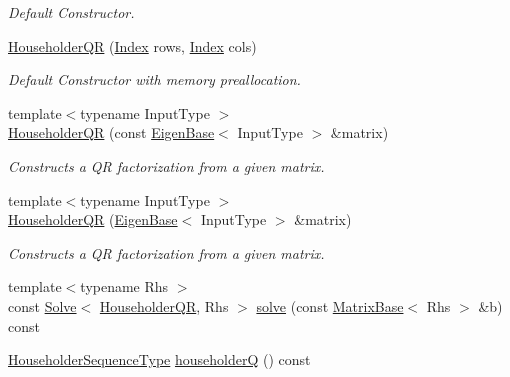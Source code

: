 \begin{DoxyCompactItemize}
\begin{DoxyCompactList}\small\item\em Default Constructor. \end{DoxyCompactList}\item 
\hyperlink{group___q_r___module_a1087457610c53e1574de521a51de0cd3}{Householder\+QR} (\hyperlink{namespace_eigen_a62e77e0933482dafde8fe197d9a2cfde}{Index} rows, \hyperlink{namespace_eigen_a62e77e0933482dafde8fe197d9a2cfde}{Index} cols)
\begin{DoxyCompactList}\small\item\em Default Constructor with memory preallocation. \end{DoxyCompactList}\item 
{\footnotesize template$<$typename Input\+Type $>$ }\\\hyperlink{group___q_r___module_afa7cfb4faa89195c4dc8d196924c8230}{Householder\+QR} (const \hyperlink{group___core___module_struct_eigen_1_1_eigen_base}{Eigen\+Base}$<$ Input\+Type $>$ \&matrix)
\begin{DoxyCompactList}\small\item\em Constructs a QR factorization from a given matrix. \end{DoxyCompactList}\item 
{\footnotesize template$<$typename Input\+Type $>$ }\\\hyperlink{group___q_r___module_a95a53f8479ee147d7b0ccab71c13e45d}{Householder\+QR} (\hyperlink{group___core___module_struct_eigen_1_1_eigen_base}{Eigen\+Base}$<$ Input\+Type $>$ \&matrix)
\begin{DoxyCompactList}\small\item\em Constructs a QR factorization from a given matrix. \end{DoxyCompactList}\item 
{\footnotesize template$<$typename Rhs $>$ }\\const \hyperlink{group___core___module_class_eigen_1_1_solve}{Solve}$<$ \hyperlink{group___q_r___module_class_eigen_1_1_householder_q_r}{Householder\+QR}, Rhs $>$ \hyperlink{group___q_r___module_a3e8e56769bbaaed0616ad98c4ff99c7b}{solve} (const \hyperlink{group___core___module_class_eigen_1_1_matrix_base}{Matrix\+Base}$<$ Rhs $>$ \&b) const
\item 
\hyperlink{group___householder___module_class_eigen_1_1_householder_sequence}{Householder\+Sequence\+Type} \hyperlink{group___q_r___module_affd506c10ef2d25f56e7b1f9f25ff885}{householderQ} () const
\item 

\end{DoxyCompactItemize}
